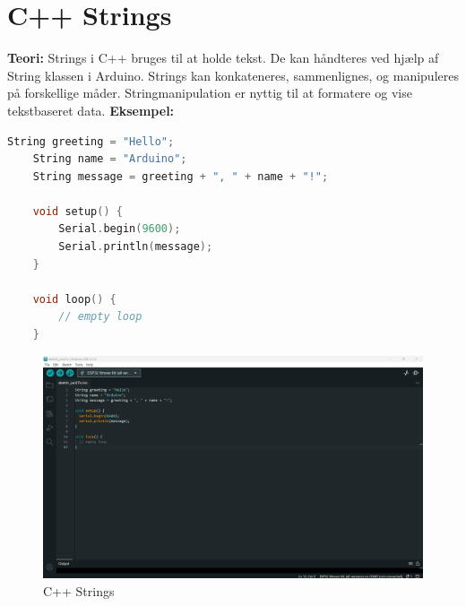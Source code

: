 \section{C++ Strings}
\textbf{Teori:} Strings i C++ bruges til at holde tekst. De kan håndteres ved hjælp af String klassen i Arduino. Strings kan konkateneres, sammenlignes, og manipuleres på forskellige måder. Stringmanipulation er nyttig til at formatere og vise tekstbaseret data.
\newline\newline
\noindent\textbf{Eksempel:}
\begin{lstlisting}[language=C++]
	String greeting = "Hello";
	String name = "Arduino";
	String message = greeting + ", " + name + "!";
	
	void setup() {
		Serial.begin(9600);
		Serial.println(message);
	}
	
	void loop() {
		// empty loop
	}
\end{lstlisting}
\begin{figure}[h!]
	\centering
	\includegraphics[width=\textwidth]{fig/fig7.png}
	\caption{C++ Strings}
	\label{fig:7}
\end{figure}

